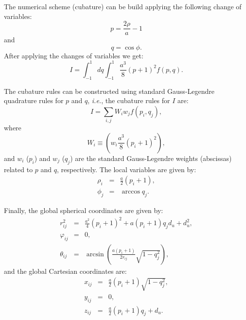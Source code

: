 \documentclass[11pt]{amsart}
\begin{document}
The numerical scheme (cubature) can be build applying the following change of variables:
\begin{equation}
	p=\frac{2\rho}{a}-1
\end{equation}
and
\begin{equation}
	q=\cos\phi.
\end{equation}
After applying the changes of variables we get:
\begin{equation}
	I=\int_{-1}^1dq\int_{-1}^1\frac{a^3}{8}(p+1)^2f(p,q).
\end{equation}

The cubature rules can be constructed using standard Gauss-Legendre quadrature rules for
$p$ and $q$, \textit{i.e.}, the cubature rules for $I$ are:
%
\begin{equation}
	I=\sum_{i,j}W_iw_jf(p_i,q_j),
\end{equation}
%
where
%
\begin{equation}
	W_i\equiv\left(w_i\frac{a^3}{8}(p_i+1)^2\right),
\end{equation}
%
and $w_i$ ($p_i$) and $w_j$ ($q_j$) are the standard Gauss-Legendre weights (abscissas) related to
$p$ and $q$, respectively.
%
The local variables are given by:
%
\begin{subequations}
\begin{eqnarray}
	\rho_{i} & = & \frac{a}{2}(p_i+1),\\
	\phi_j & = & \arccos q_j.
\end{eqnarray}
%
\end{subequations}

Finally, the global spherical coordinates are given by:
%
\begin{subequations}
\begin{eqnarray}
	r^2_{ij} & = & \frac{a^2}{4}(p_i+1)^2+a(p_i+1)q_jd_u+d_u^2,\\
	\varphi_{ij} & = & 0,\\
	\theta_{ij} & = & \arcsin\left(\frac{a(p_i+1)}{2r_{ij}}\sqrt{1-q_j^2}\right),
\end{eqnarray}
\end{subequations}
%
and the global Cartesian coordinates are:
%
\begin{subequations}
\begin{eqnarray}
	x_{ij} & = & \frac{a}{2}(p_i+1)\sqrt{1-q_j^2},\\
	y_{ij} & = & 0,\\
	z_{ij} & = & \frac{a}{2}(p_i+1)q_j+d_u.
\end{eqnarray}
%
\end{subequations}
\end{document}
